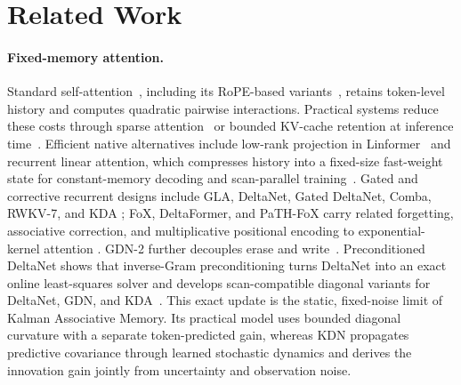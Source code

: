 \documentclass[11pt,letterpaper,logo]{yalearxiv}
\begin{document}
\FloatBarrier

\section{Related Work}
\label{sec:related-work}

\paragraph{Fixed-memory attention.}
Standard self-attention~\citep{vaswani2017attention}, including its RoPE-based variants~\citep{su2024roformer}, retains token-level history and computes quadratic pairwise interactions. Practical systems reduce these costs through sparse attention~\citep{liu2025deepseek} or bounded KV-cache retention at inference time~\citep{xiao2024efficient,bui2026cache,bui2026make}. Efficient native alternatives include low-rank
projection in Linformer~\citep{wang2020linformer} and recurrent linear attention, which compresses
history into a fixed-size fast-weight state for constant-memory decoding and scan-parallel
training~\citep{katharopoulos2020transformers}. Gated and corrective recurrent designs include GLA,
DeltaNet, Gated DeltaNet, Comba, RWKV-7, and KDA
\citep{yang2023gated,schlag2021linear,yang2024gdn,hu2025comba,
peng2025rwkv7,kimiteam2025kimilinear}; FoX, DeltaFormer, and PaTH-FoX carry related forgetting,
associative correction, and multiplicative positional encoding to exponential-kernel attention
\citep{lin2025forgetting,zhong2025understanding,yang2025path}. GDN-2 further decouples erase and
write~\citep{hatamizadeh2026gdn2}. Preconditioned DeltaNet shows that inverse-Gram
preconditioning turns DeltaNet into an exact online least-squares solver and develops
scan-compatible diagonal variants for DeltaNet, GDN, and KDA~\citep{tumma2026preconditioned}.
This exact update is the static, fixed-noise limit of Kalman Associative Memory. Its practical
model uses bounded diagonal curvature with a separate token-predicted gain, whereas KDN propagates
predictive covariance through learned stochastic dynamics and derives the innovation gain jointly
from uncertainty and observation noise.
\end{document}
